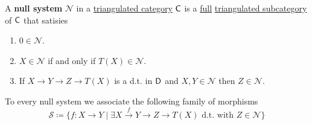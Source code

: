 \documentclass[../../main]{subfiles}
\begin{document}
\begin{definition}
  A \textbf{null system} \(\mathcal{N}\) in a \hyperref[def:triangulated-category]{triangulated category} \(\mathsf{C}\) is a \hyperref[def:subcategory]{full} \hyperref[def:triangulated-subcategory]{triangulated subcategory} of \(\mathsf{C}\) that satisies
  \begin{enumerate}[label=N.\arabic*), ref=N.\arabic*]
    \item \(0 \in \mathcal{N}\).
    \item \(X \in \mathcal{N}\) if and only if \(T(X) \in \mathcal{N}\).
    \item If \(X \to Y \to Z \to T(X)\) is a d.t. in \(\mathsf{D}\) and \(X, Y \in \mathcal{N}\) then \(Z \in \mathcal{N}\).
  \end{enumerate}

  To every null system we associate the following family of morphisms
  \begin{equation*}
    \mathcal{S} \coloneq \{f: X \to Y \mid \exists X \xrightarrow{f} Y \to Z \to T(X) \text{ d.t. with } Z \in \mathcal{N}\}
  \end{equation*}
\end{definition}
\end{document}
